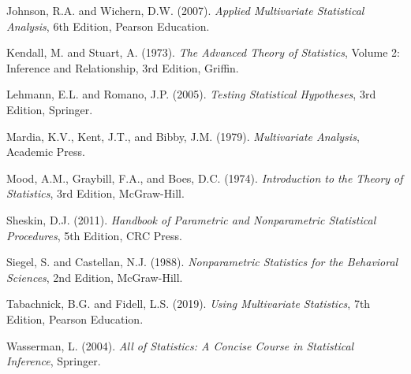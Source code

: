 \begin{thebibliography}{99}
 Johnson, R.A. and Wichern, D.W. (2007). \textit{Applied Multivariate Statistical Analysis}, 6th Edition, Pearson Education.

 Kendall, M. and Stuart, A. (1973). \textit{The Advanced Theory of Statistics}, Volume 2: Inference and Relationship, 3rd Edition, Griffin.

 Lehmann, E.L. and Romano, J.P. (2005). \textit{Testing Statistical Hypotheses}, 3rd Edition, Springer.

 Mardia, K.V., Kent, J.T., and Bibby, J.M. (1979). \textit{Multivariate Analysis}, Academic Press.

 Mood, A.M., Graybill, F.A., and Boes, D.C. (1974). \textit{Introduction to the Theory of Statistics}, 3rd Edition, McGraw-Hill.

 Sheskin, D.J. (2011). \textit{Handbook of Parametric and Nonparametric Statistical Procedures}, 5th Edition, CRC Press.

 Siegel, S. and Castellan, N.J. (1988). \textit{Nonparametric Statistics for the Behavioral Sciences}, 2nd Edition, McGraw-Hill.

 Tabachnick, B.G. and Fidell, L.S. (2019). \textit{Using Multivariate Statistics}, 7th Edition, Pearson Education.

 Wasserman, L. (2004). \textit{All of Statistics: A Concise Course in Statistical Inference}, Springer.

\end{thebibliography}